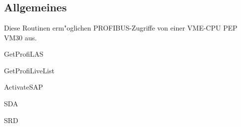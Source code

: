 \section{}

\subsection{Allgemeines}

Diese Routinen erm"oglichen PROFIBUS-Zugriffe von einer VME-CPU PEP VM30
aus.

\begin{procdesc}{GetProfiLAS}{}
\end{procdesc}

\begin{procdesc}{GetProfiLiveList}{}
\end{procdesc}

\begin{procdesc}{ActivateSAP}{}
\end{procdesc}

\begin{procdesc}{SDA}{}
\end{procdesc}

\begin{procdesc}{SRD}{}
\end{procdesc}
